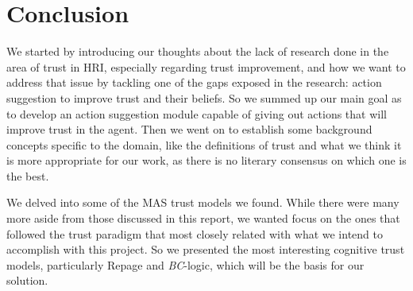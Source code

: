 \section{Conclusion}
\label{sec:Conclusion}
We started by introducing our thoughts about the lack of research done in the area of trust in \ac{HRI}, especially regarding trust improvement, and how we want to address that issue by tackling one of the gaps exposed in the research: action suggestion to improve trust and their beliefs. So we summed up our main goal as to develop an action suggestion module capable of giving out actions that will improve trust in the agent. Then we went on to establish some background concepts specific to the domain, like the definitions of trust and what we think it is more appropriate for our work, as there is no literary consensus on which one is the best. 

We delved into some of the \ac{MAS} trust models we found. While there were many more aside from those discussed in this report, we wanted focus on the ones that followed the trust paradigm that most closely related with what we intend to accomplish with this project. So we presented the most interesting cognitive trust models, particularly Repage and \textit{BC}-logic, which will be the basis for our solution.